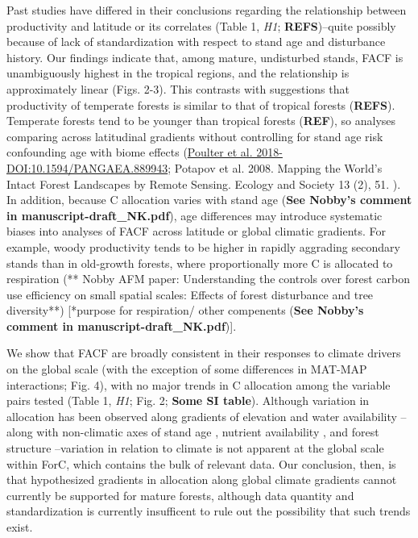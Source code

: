 \documentclass[]{article}
\begin{document}
Past studies have differed in their conclusions regarding the
relationship between productivity and latitude or its correlates (Table
1, \emph{H1}; \textbf{REFS})--quite possibly because of lack of
standardization with respect to stand age and disturbance history. Our
findings indicate that, among mature, undisturbed stands, FACF is
unambiguously highest in the tropical regions, and the relationship is
approximately linear (Figs. 2-3). This contrasts with suggestions that
productivity of temperate forests is similar to that of tropical forests
(\textbf{REFS}). Temperate forests tend to be younger than tropical
forests (\textbf{REF}), so analyses comparing across latitudinal
gradients without controlling for stand age risk confounding age with
biome effects (\href{http://pure.iiasa.ac.at/id/eprint/15361/}{Poulter
et al. 2018-DOI:10.1594/PANGAEA.889943}; Potapov et al. 2008. Mapping
the World's Intact Forest Landscapes by Remote Sensing. Ecology and
Society 13 (2), 51. ). In addition, because C allocation varies with
stand age \citep{de_lucia_forest_2007} (\textbf{See Nobby's comment in
manuscript-draft\_NK.pdf}), age differences may introduce systematic
biases into analyses of FACF across latitude or global climatic
gradients. For example, woody productivity tends to be higher in rapidly
aggrading secondary stands than in old-growth forests, where
proportionally more C is allocated to respiration (** Nobby AFM paper:
Understanding the controls over forest carbon use efficiency on small
spatial scales: Effects of forest disturbance and tree diversity**)
{[}*purpose for respiration/ other compenents (\textbf{See Nobby's
comment in manuscript-draft\_NK.pdf}){]}.

We show that FACF are broadly consistent in their responses to climate
drivers on the global scale (with the exception of some differences in
MAT-MAP interactions; Fig. 4), with no major trends in C allocation
among the variable pairs tested (Table 1, \emph{H1}; Fig. 2;
\textbf{Some SI table}). Although variation in allocation has been
observed along gradients of elevation \citep{moser_elevation_2011} and
water availability \citep{newman_above-_2006}--along with non-climatic
axes of stand age \citep{litton_carbon_2007}, nutrient availability
\citep{litton_carbon_2007, gill_belowground_2016}, and forest structure
\citep{taylor_greater_2019}--variation in relation to climate is not
apparent at the global scale within ForC, which contains the bulk of
relevant data. Our conclusion, then, is that hypothesized gradients in
allocation along global climate gradients cannot currently be supported
for mature forests, although data quantity and standardization is
currently insufficent to rule out the possibility that such trends
exist.
\end{document}
